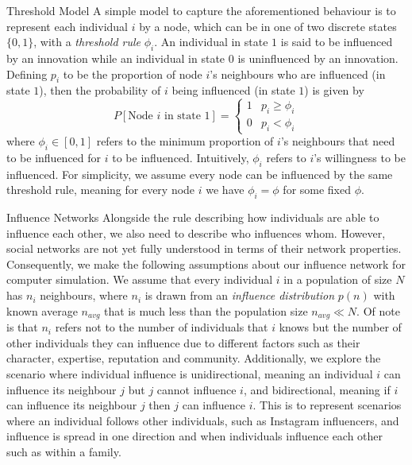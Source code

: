 \documentclass[10pt, oneside, reqno]{amsart}
\makeatletter
\theoremstyle{plain}%
\theoremstyle{definition}
\theoremstyle{remark}
\renewcommand\subsection{\@startsection{subsection}{2}%
  \z@{.5\linespacing\@plus.7\linespacing}{-.5em}%
  {\normalfont\scshape}}
\makeatother
\begin{document}
\subsection{Threshold Model}
A simple model to capture the aforementioned behaviour is to represent each individual $i$ by a node,
which can be in one of two discrete states $\{ 0, 1\}$, with a \textit{threshold rule} $\phi_i$. 
An individual in state $1$ is said to be influenced by an innovation while an 
individual in state $0$ is uninfluenced by an innovation.
Defining $p_i$ to be the proportion of node $i$'s neighbours who are influenced (in state $1$), then 
the probability of $i$ being influenced (in state $1$) is given by
\[ P[\text{Node } i \text{ in state } 1] = 
\begin{cases}
    1 & p_i \geq \phi_i \\
    0 & p_i < \phi_i
\end{cases} \]
where $\phi_i \in [0,1]$ refers to the minimum proportion of $i$'s neighbours that need to be 
influenced for $i$ to be influenced. Intuitively, $\phi_i$ refers to $i$'s willingness to be 
influenced.
For simplicity, we assume every node can be influenced by the same threshold rule, meaning 
for every node $i$ we have $\phi_i = \phi$ for some fixed $\phi$.

\subsection{Influence Networks}
Alongside the rule describing how individuals are able to influence each other, we also need to 
describe who influences whom.
However, social networks are not yet fully understood in terms of their network properties. 
Consequently, we make the following assumptions about our influence network for computer 
simulation.
We assume that every individual $i$ in a population of size $N$ has $n_i$ neighbours, where 
$n_i$ is drawn from an \textit{influence distribution} $p(n)$ with known average $n_{avg}$ that is much less 
than the population size $n_{avg} \ll N$.
Of note is that $n_i$ refers not to the number of individuals that $i$ knows but the number of 
other individuals they can influence due to different factors such as their character, expertise, reputation and community.
Additionally, we explore the scenario where individual influence is unidirectional, meaning 
an individual $i$ can influence its neighbour $j$ but $j$ cannot influence $i$, and 
bidirectional, meaning if $i$ can influence its neighbour $j$ then $j$ can influence $i$. 
This is to represent scenarios where an individual follows other individuals, such as Instagram 
influencers, and influence is spread in one direction and when individuals influence each 
other such as within a family.
\end{document}
